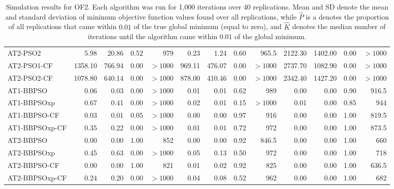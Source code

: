 \documentclass[cmbright]{staauth}
\numberwithin{table}{section}
\begin{document}
\begin{table}[ht]
\begin{tabular}{l|rrrr|rrrr|rrrr}
  AT2-PSO2 & 5.98 & 20.86 & 0.52 & 979 & 0.23 & 1.24 & 0.60 & 965.5 & 2122.30 & 1402.00 & 0.00 & $> 1000$ \\
  AT2-PSO1-CF & 1358.10 & 766.94 & 0.00 & $> 1000$ & 969.11 & 476.07 & 0.00 & $> 1000$ & 2737.70 & 1082.90 & 0.00 & $> 1000$ \\
  AT2-PSO2-CF & 1078.80 & 640.14 & 0.00 & $> 1000$ & 878.00 & 410.46 & 0.00 & $> 1000$ & 2342.40 & 1427.20 & 0.00 & $> 1000$ \\
   \hline
AT1-BBPSO & 0.06 & 0.03 & 0.00 & $> 1000$ & 0.01 & 0.01 & 0.62 & 989 & 0.00 & 0.00 & 0.90 & 916.5 \\
  AT1-BBPSOxp & 0.67 & 0.41 & 0.00 & $> 1000$ & 0.02 & 0.01 & 0.15 & $> 1000$ & 0.01 & 0.00 & 0.85 & 944 \\
  AT1-BBPSO-CF & 0.03 & 0.01 & 0.05 & $> 1000$ & 0.00 & 0.00 & 0.97 & 916 & 0.00 & 0.00 & 1.00 & 819.5 \\
  AT1-BBPSOxp-CF & 0.35 & 0.22 & 0.00 & $> 1000$ & 0.01 & 0.01 & 0.72 & 972 & 0.00 & 0.00 & 1.00 & 873.5 \\
   \hline
AT2-BBPSO & 0.00 & 0.00 & 1.00 & 852 & 0.00 & 0.00 & 0.92 & 846.5 & 0.00 & 0.00 & 1.00 & 660 \\
  AT2-BBPSOxp & 0.45 & 0.63 & 0.00 & $> 1000$ & 0.05 & 0.13 & 0.50 & 972 & 0.00 & 0.00 & 1.00 & 718 \\
  AT2-BBPSO-CF & 0.00 & 0.00 & 1.00 & 821 & 0.01 & 0.02 & 0.92 & 825 & 0.00 & 0.00 & 1.00 & 636.5 \\
  AT2-BBPSOxp-CF & 0.24 & 0.20 & 0.00 & $> 1000$ & 0.04 & 0.08 & 0.52 & 962 & 0.00 & 0.00 & 1.00 & 682 \\
   \hline
\end{tabular}
\endgroup
\caption{Simulation results for OF2. Each algorithm was run for 1,000 iterations over 40 replications. Mean and SD denote the mean and standard deviation of minimum objective function values found over all replications, while $\widehat{P}$ is a denotes the proportion of all replications that came within $0.01$ of the true global minimum (equal to zero), and $\widehat{K}$ denotes the median number of iterations until the algorithm came within $0.01$ of the global minimum.}
\label{tab:psosim2}
\end{table}
\end{document}
